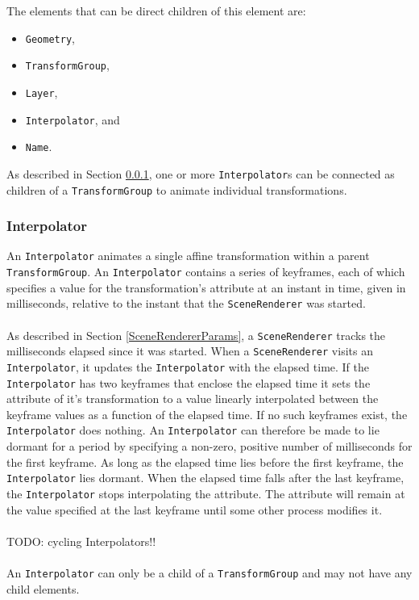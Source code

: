\documentclass[10pt,aps, prb,preprint]{article}
\begin{document}
The elements that can be direct children of this element are:
\begin{itemize}
\item \texttt{Geometry},
\item \texttt{TransformGroup},
\item \texttt{Layer},
\item \texttt{Interpolator}, and
\item \texttt{Name}.
\end{itemize}
As described in Section \ref{interpolator}, one or more \texttt{Interpolator}s can be connected as children of a \texttt{TransformGroup} to animate individual transformations.




\subsubsection{Interpolator}
\label{interpolator}
An \texttt{Interpolator} animates a single affine transformation within a parent \texttt{TransformGroup}.  An \texttt{Interpolator} contains a series of keyframes, each of which specifies a value for the transformation's attribute at an instant in time, given in milliseconds, relative to the instant that the \texttt{SceneRenderer} was started.
\\
\\
As described in Section \ref{SceneRendererParams}, a \texttt{SceneRenderer} tracks the milliseconds elapsed since it was started. When a \texttt{SceneRenderer} visits an \texttt{Interpolator}, it updates the \texttt{Interpolator} with the elapsed time. If the \texttt{Interpolator} has two keyframes that enclose the elapsed time it sets the attribute of it's transformation to a value linearly interpolated between the keyframe values as a function of the elapsed time. If no such keyframes exist, the \texttt{Interpolator} does nothing. An \texttt{Interpolator} can therefore be made to lie dormant for a period by specifying a non-zero, positive number of milliseconds for the first keyframe. As long as the elapsed time lies before the first keyframe, the \texttt{Interpolator} lies dormant. When the elapsed time falls after the last keyframe, the \texttt{Interpolator} stops interpolating the attribute. The attribute will remain at the value specified at the last keyframe until some other process modifies it.
\\
\\
TODO: cycling Interpolators!!
\\
\\
An \texttt{Interpolator} can only be a child of a \texttt{TransformGroup} and may not have any child elements.
\end{document}
